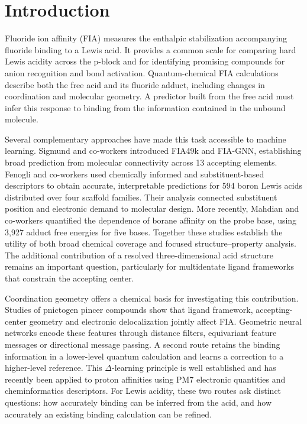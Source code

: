 \section{Introduction}

Fluoride ion affinity (FIA) measures the enthalpic stabilization accompanying fluoride binding to a Lewis acid. It provides a common scale for comparing hard Lewis acidity across the p-block and for identifying promising compounds for anion recognition and bond activation. Quantum-chemical FIA calculations describe both the free acid and its fluoride adduct, including changes in coordination and molecular geometry. \cite{sigmund2024fia,erdmann2020fia} A predictor built from the free acid must infer this response to binding from the information contained in the unbound molecule.

Several complementary approaches have made this task accessible to machine learning. Sigmund and co-workers introduced FIA49k and FIA-GNN, establishing broad prediction from molecular connectivity across 13 accepting elements. \cite{sigmund2024fia} Fenogli and co-workers used chemically informed and substituent-based descriptors to obtain accurate, interpretable predictions for 594 boron Lewis acids distributed over four scaffold families. \cite{fenogli2025boron} Their analysis connected substituent position and electronic demand to molecular design. More recently, Mahdian and co-workers quantified the dependence of borane affinity on the probe base, using 3,927 adduct free energies for five bases. \cite{mahdian2026base} Together these studies establish the utility of both broad chemical coverage and focused structure--property analysis. The additional contribution of a resolved three-dimensional acid structure remains an important question, particularly for multidentate ligand frameworks that constrain the accepting center.

Coordination geometry offers a chemical basis for investigating this contribution. Studies of pnictogen pincer compounds show that ligand framework, accepting-center geometry and electronic delocalization jointly affect FIA. \cite{kirsch2025pnictogen} Geometric neural networks encode these features through distance filters, equivariant feature messages or directional message passing. \cite{satorras2021egnn,gasteiger2020dimenet,schutt2017schnet} A second route retains the binding information in a lower-level quantum calculation and learns a correction to a higher-level reference. This $\Delta$-learning principle is well established \cite{ramakrishnan2015delta} and has recently been applied to proton affinities using PM7 electronic quantities and cheminformatics descriptors. \cite{bhattacharya2026proton} For Lewis acidity, these two routes ask distinct questions: how accurately binding can be inferred from the acid, and how accurately an existing binding calculation can be refined.

